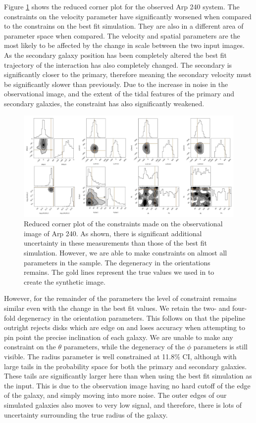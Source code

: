 Figure \ref{fig:obs_corner_plot} shows the reduced corner plot for the observed Arp 240 system. The constraints on the velocity parameter have significantly worsened when compared to the constrains on the best fit simulation. They are also in a different area of parameter space when compared. The velocity and spatial parameters are the most likely to be affected by the change in scale between the two input images. As the secondary galaxy position has been completely altered the best fit trajectory of the interaction has also completely changed. The secondary is significantly closer to the primary, therefore meaning the secondary velocity must be significantly slower than previously. Due to the increase in noise in the observational image, and the extent of the tidal features of the primary and secondary galaxies, the constraint has also significantly weakened.

\begin{figure}
    \centering
    \includegraphics[width=\textwidth]{Chapter1/figures/Arp240_obs-red-corner.pdf}
    \caption{Reduced corner plot of the constraints made on the observational image of Arp 240. As shown, there is significant additional uncertainty in these measurements than those of the best fit simulation. However, we are able to make constraints on almost all parameters in the sample. The degeneracy in the orientations remains. The gold lines represent the true values we used in to create the synthetic image.}
    \label{fig:obs_corner_plot}
\end{figure}

However, for the remainder of the parameters the level of constraint remains similar even with the change in the best fit values. We retain the two- and four-fold degeneracy in the orientation parameters. This follows on that the pipeline outright rejects disks which are edge on and loses accuracy when attempting to pin point the precise inclination of each galaxy. We are unable to make any constraint on the $\theta$ parameters, while the degeneracy of the $\phi$ parameters is still visible. The radius parameter is well constrained at 11.8\% CI, although with large tails in the probability space for both the primary and secondary galaxies. These tails are significantly larger here than when using the best fit simulation as the input. This is due to the observation image having no hard cutoff of the edge of the galaxy, and simply moving into more noise. The outer edges of our simulated galaxies also moves to very low signal, and therefore, there is lots of uncertainty surrounding the true radius of the galaxy. 

